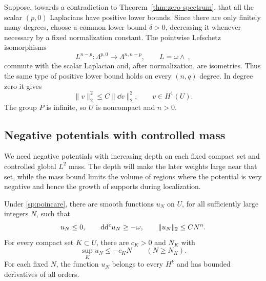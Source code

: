 Suppose, towards a contradiction to Theorem~\ref{thm:zero-spectrum}, that
all the scalar $(p,0)$ Laplacians have positive lower bounds.  Since there
are only finitely many degrees, choose a common lower bound $\delta>0$,
decreasing it whenever necessary by a fixed normalization constant.
The pointwise Lefschetz isomorphisms
\[
 L^{n-p}:\Lambda^{p,0}\longrightarrow\Lambda^{n,n-p},
 \qquad L=\omega\wedge\ ,
\]
commute with the scalar Laplacian and, after normalization, are isometries.
Thus the same type of positive lower bound holds on every $(n,q)$ degree.
In degree zero it gives
\begin{equation}\label{sp:poincare}
 \|v\|_2^2\le C\|\dd v\|_2^2,
 \qquad v\in H^1(U).
\end{equation}
The group $P$ is infinite, so $U$ is noncompact and $n>0$.

\subsection{Negative potentials with controlled mass}
\label{sp:potentials}

We need negative potentials with increasing depth on each fixed compact
set and controlled global \(L^2\) mass. The depth will make the later
weights large near that set, while the mass bound limits the volume of
regions where the potential is very negative and hence the growth of
supports during localization.

\begin{lemma}\label{sp:potential-lemma}
Under \eqref{sp:poincare}, there are smooth functions $u_N$ on $U$, for
all sufficiently large integers $N$, such that
\begin{equation}\label{sp:potential-bounds}
 u_N\le0,\qquad \mathrm d\mathrm d^c u_N\ge-\omega,
 \qquad \|u_N\|_2\le C N^n.
\end{equation}
For every compact set $K\subset U$, there are $c_K>0$ and $N_K$ with
\begin{equation}\label{sp:potential-depth}
 \sup_Ku_N\le-c_KN\qquad(N\ge N_K).
\end{equation}
For each fixed $N$, the function $u_N$ belongs to every $H^k$ and has
bounded derivatives of all orders.
\end{lemma}

